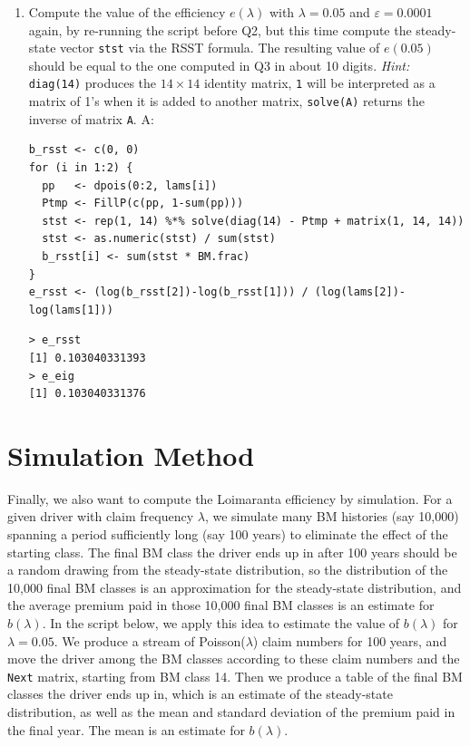 \documentclass{article}
\begin{document}
\begin{enumerate}
  \item [$\boldsymbol{Q}_4$] Compute the value of the efficiency $e(\lambda)$ with $\lambda = 0.05$ and $\varepsilon = 0.0001$ again, by re-running the script before Q2, but this time compute the steady-state vector \texttt{stst} via the RSST formula. The resulting value of $e(0.05)$ should be equal to the one computed in Q3 in about 10 digits. \textit{Hint:} \texttt{diag(14)} produces the $14 \times 14$ identity matrix, \texttt{1} will be interpreted as a matrix of 1's when it is added to another matrix, \texttt{solve(A)} returns the inverse of matrix \texttt{A}. \newline
  A:
\begin{lstlisting}
b_rsst <- c(0, 0)
for (i in 1:2) {
  pp   <- dpois(0:2, lams[i])
  Ptmp <- FillP(c(pp, 1-sum(pp)))
  stst <- rep(1, 14) %*% solve(diag(14) - Ptmp + matrix(1, 14, 14))
  stst <- as.numeric(stst) / sum(stst)
  b_rsst[i] <- sum(stst * BM.frac)
}
e_rsst <- (log(b_rsst[2])-log(b_rsst[1])) / (log(lams[2])-log(lams[1]))
\end{lstlisting}
\begin{lstlisting}
> e_rsst
[1] 0.103040331393
> e_eig
[1] 0.103040331376
\end{lstlisting}
\end{enumerate}
\clearpage

\section{Simulation Method}
 
Finally, we also want to compute the Loimaranta efficiency by simulation. For a given driver with claim frequency $\lambda$, we simulate many BM histories (say 10,000) spanning a period sufficiently long (say 100 years) to eliminate the effect of the starting class. The final BM class the driver ends up in after 100 years should be a random drawing from the steady-state distribution, so the distribution of the 10,000 final BM classes is an approximation for the steady-state distribution, and the average premium paid in those 10,000 final BM classes is an estimate for $b(\lambda)$. \newline
In the script below, we apply this idea to estimate the value of $b(\lambda)$ for $\lambda = 0.05$. We produce a stream of Poisson($\lambda$) claim numbers for 100 years, and move the driver among the BM classes according to these claim numbers and the \texttt{Next} matrix, starting from BM class 14. Then we produce a table of the final BM classes the driver ends up in, which is an estimate of the steady-state distribution, as well as the mean and standard deviation of the premium paid in the final year. The mean is an estimate for $b(\lambda)$.
 
\end{document}
